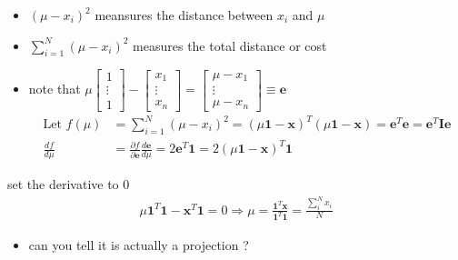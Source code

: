 \documentclass{scrartcl}
\def\tightlist{}
\newcommand{\vv}[1]{\boldsymbol{#1}}
\begin{document}
\begin{frame}{}
\protect\hypertarget{section-7}{}

\begin{itemize}
\tightlist
\item
  \((\mu -x_i)^2\) meansures the distance between \(x_i\) and \(\mu\)
\item
  \(\sum_{i=1}^{N} (\mu -x_i)^2\) measures the total distance or cost
\item
  note that
  \(\mu\begin{bmatrix}1\\ \vdots \\1 \end{bmatrix} - \begin{bmatrix}x_1 \\\vdots \\x_n\end{bmatrix} = \begin{bmatrix}\mu-x_1 \\\vdots \\\mu-x_n\end{bmatrix} \equiv \vv{e}\)
  \begin{align*} 
  \text{Let } f(\mu) &= \sum_{i=1}^{N} (\mu -x_i)^2 = (\mu \vv{1}- \vv{x})^{T}(\mu \vv{1}- \vv{x})= \vv{e}^T\vv{e} = \vv{e}^T\vv{I}\vv{e} \\
  \frac{df}{d\mu} &=  \frac{\partial f}{\partial \vv{e}}\frac{d\vv{e}}{d\mu}= 2\vv{e}^T\vv{1} = 2(\mu\vv{1} - \vv{x})^T \vv{1}
  \end{align*}
\end{itemize}

\bigskip

set the derivative to 0 \begin{align*} 
\mu\vv{1}^T\vv{1} -\vv{x}^T \vv{1}= 0 \Rightarrow  \mu = \frac{\vv{1}^T\vv{x}}{\vv{1}^T\vv{1}} = \frac{\sum_{i}^N x_i}{N}
\end{align*}

\begin{itemize}
\tightlist
\item
  can you tell it is actually a projection ?
\end{itemize}

\end{frame}
\end{document}
